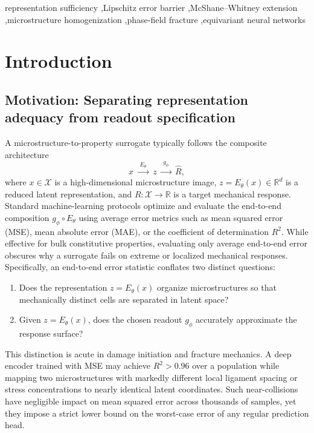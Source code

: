 \documentclass[preprint,11pt,a4paper]{elsarticle}
\newcommand{\R}{\mathbb{R}}
\newcommand{\X}{\mathcal{X}}
\begin{document}
\begin{frontmatter}
\begin{keyword}
representation sufficiency \sep Lipschitz error barrier \sep McShane--Whitney extension \sep microstructure homogenization \sep phase-field fracture \sep equivariant neural networks
\end{keyword}

\end{frontmatter}

\section{Introduction}
\label{sec:intro}

\subsection{Motivation: Separating representation adequacy from readout specification}

A microstructure-to-property surrogate typically follows the composite architecture
\begin{equation}
x
\;\xrightarrow{\;E_\theta\;}\;
z
\;\xrightarrow{\;g_\phi\;}\;
\widehat R,
\label{eq:pipeline}
\end{equation}
where $x\in\X$ is a high-dimensional microstructure image, $z=E_\theta(x)\in\R^d$ is a reduced latent representation, and $R:\X\to\R$ is a target mechanical response. Standard machine-learning protocols optimize and evaluate the end-to-end composition $g_\phi\circ E_\theta$ using average error metrics such as mean squared error (MSE), mean absolute error (MAE), or the coefficient of determination $R^2$. While effective for bulk constitutive properties, evaluating only average end-to-end error obscures why a surrogate fails on extreme or localized mechanical responses. Specifically, an end-to-end error statistic conflates two distinct questions:
\begin{enumerate}
    \item Does the representation $z=E_\theta(x)$ organize microstructures so that mechanically distinct cells are separated in latent space?
    \item Given $z=E_\theta(x)$, does the chosen readout $g_\phi$ accurately approximate the response surface?
\end{enumerate}

This distinction is acute in damage initiation and fracture mechanics. A deep encoder trained with MSE may achieve $R^2>0.96$ over a population while mapping two microstructures with markedly different local ligament spacing or stress concentrations to nearly identical latent coordinates. Such near-collisions have negligible impact on mean squared error across thousands of samples, yet they impose a strict lower bound on the worst-case error of any regular prediction head.
\end{document}
